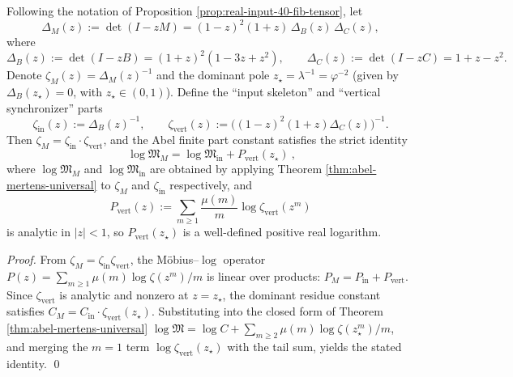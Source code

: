 \begin{proposition}\label{prop:real-input-40-logM-split}
Following the notation of Proposition \ref{prop:real-input-40-fib-tensor}, let
\[
\Delta_M(z):=\det(I-zM)=(1-z)^2(1+z)\,\Delta_B(z)\,\Delta_C(z),
\]
where
\[
\Delta_B(z):=\det(I-zB)=(1+z)^2(1-3z+z^2),
\qquad
\Delta_C(z):=\det(I-zC)=1+z-z^2.
\]
Denote
\(
\zeta_M(z)=\Delta_M(z)^{-1}
\)
and the dominant pole
\(
z_\star=\lambda^{-1}=\varphi^{-2}
\)
(given by $\Delta_B(z_\star)=0$, with $z_\star\in(0,1)$).
Define the ``input skeleton'' and ``vertical synchronizer'' parts
\[
\zeta_{\mathrm{in}}(z):=\Delta_B(z)^{-1},
\qquad
\zeta_{\mathrm{vert}}(z):=\bigl((1-z)^2(1+z)\Delta_C(z)\bigr)^{-1}.
\]
Then $\zeta_M=\zeta_{\mathrm{in}}\cdot \zeta_{\mathrm{vert}}$, and the Abel finite part constant satisfies the strict identity
\[
\boxed{\ \log\mathfrak{M}_M=\log\mathfrak{M}_{\mathrm{in}}+P_{\mathrm{vert}}(z_\star)\ },
\]
where $\log\mathfrak{M}_M$ and $\log\mathfrak{M}_{\mathrm{in}}$ are obtained by applying Theorem \ref{thm:abel-mertens-universal} to $\zeta_M$ and $\zeta_{\mathrm{in}}$ respectively, and
\[
P_{\mathrm{vert}}(z):=\sum_{m\ge 1}\frac{\mu(m)}{m}\log \zeta_{\mathrm{vert}}(z^m)
\]
is analytic in $|z|<1$, so $P_{\mathrm{vert}}(z_\star)$ is a well-defined positive real logarithm.
\end{proposition}
\begin{proof}
From $\zeta_M=\zeta_{\mathrm{in}}\zeta_{\mathrm{vert}}$, the M\"obius--$\log$ operator $P(z)=\sum_{m\ge 1}\mu(m)\log\zeta(z^m)/m$ is linear over products:
\(
P_M=P_{\mathrm{in}}+P_{\mathrm{vert}}
\).
Since $\zeta_{\mathrm{vert}}$ is analytic and nonzero at $z=z_\star$, the dominant residue constant satisfies
\(
C_M=C_{\mathrm{in}}\cdot \zeta_{\mathrm{vert}}(z_\star)
\).
Substituting into the closed form of Theorem \ref{thm:abel-mertens-universal}
\(
\log\mathfrak{M}=\log C+\sum_{m\ge 2}\mu(m)\log\zeta(z_\star^m)/m
\),
and merging the $m=1$ term $\log\zeta_{\mathrm{vert}}(z_\star)$ with the tail sum, yields the stated identity. \qed
\end{proof}

